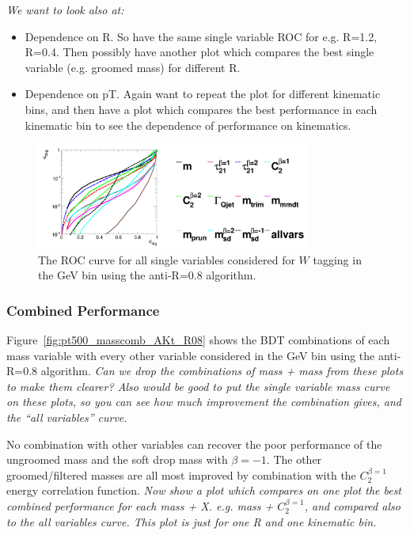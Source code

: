 {\it We want to look also at:
\begin{itemize}
\item Dependence on R. So have the same single variable ROC for
e.g. R=1.2, R=0.4. Then possibly have another plot which compares the
best single variable (e.g. groomed mass) for
different R.
\item Dependence on pT. Again want to repeat the plot for different
kinematic bins, and then have a plot which compares the best
performance in each kinematic bin to see the dependence of performance
on kinematics.
\end{itemize}
}

\begin{figure}
\begin{center}
\includegraphics[width=0.8\textwidth]{./Figures/WTagging/pT500/AKtR08/Rocs_1D_single.png}
\caption{The ROC curve for all single variables considered for $W$
tagging in the  GeV bin using the anti-\kT R=0.8 algorithm.}
\label{fig:pt500_single_AKt_R08}
\end{center}
\end{figure}

\subsubsection{Combined Performance}

Figure~\ref{fig:pt500_masscomb_AKt_R08} shows the BDT combinations of each mass variable with every other
variable considered in the  GeV bin using the anti-\kT R=0.8
algorithm. {\it Can we drop the combinations of mass + mass
from these plots to make them clearer? Also would be good to put the
single variable mass curve on these plots, so you can see how much
improvement the combination gives, and the ``all variables'' curve.}

No combination with other variables can recover the poor performance
of the ungroomed mass and the soft drop mass with $\beta=-1$. The
other groomed/filtered masses are all most improved by combination
with the $C_{2}^{\beta=1}$ energy correlation function.
{\it Now show a plot which compares on one plot the best combined performance for
each mass + X. e.g. mass + $C_{2}^{\beta=1}$, and compared also to the
all variables curve. This plot is just for
one R and one kinematic bin.}

